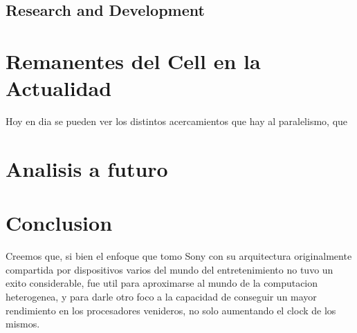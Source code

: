 \documentclass[10pt,compsoc]{IEEEtran}
\begin{document}
	
	\subsection{Research and Development}
	\noindent
	
	
	
	\section{Remanentes del Cell en la Actualidad}%
	\noindent Hoy en dia se pueden ver los distintos acercamientos que hay al paralelismo, que 
	
	
	
	
	
	
	
	\section{Analisis a futuro}
	\noindent 
	
	
	
	
	
	
	\section{Conclusion}
	\noindent Creemos que, si bien el enfoque que tomo Sony con su arquitectura originalmente compartida por dispositivos varios del mundo del entretenimiento no tuvo un exito considerable, fue util para aproximarse al mundo de la computacion heterogenea, y para darle otro foco a la capacidad de conseguir un mayor rendimiento en los procesadores venideros, no solo aumentando el clock de los mismos.
	
\end{document}
